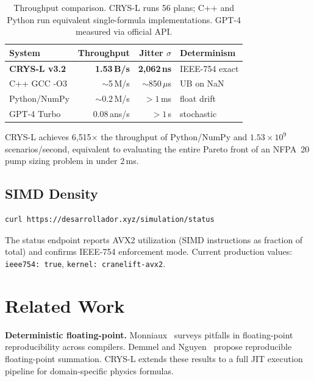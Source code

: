 \documentclass[10pt,twocolumn]{article}
\begin{document}
\begin{table}[h]
\centering
\small
\begin{tabular}{lrrl}
\toprule
System & Throughput & Jitter $\sigma$ & Determinism \\
\midrule
\textbf{CRYS-L v3.2} & \textbf{1.53\,B/s} & \textbf{2{,}062\,ns} & IEEE-754 exact \\
C++ GCC -O3 & $\sim$5\,M/s & $\sim$850\,$\mu$s & UB on NaN \\
Python/NumPy & $\sim$0.2\,M/s & $>1$\,ms & float drift \\
GPT-4 Turbo & 0.08\,ans/s & $>1$\,s & stochastic \\
\bottomrule
\end{tabular}
\caption{Throughput comparison. CRYS-L runs 56 plans; C++ and Python run equivalent
single-formula implementations. GPT-4 measured via official API.}
\label{tab:throughput}
\end{table}

CRYS-L achieves 6{,}515$\times$ the throughput of Python/NumPy and
$1.53\times10^9$ scenarios/second, equivalent to evaluating the entire
Pareto front of an NFPA~20 pump sizing problem in under 2\,ms.

\subsection{SIMD Density}

\begin{lstlisting}[language=bash]
curl https://desarrollador.xyz/simulation/status
\end{lstlisting}

The status endpoint reports AVX2 utilization (SIMD instructions as fraction of total)
and confirms IEEE-754 enforcement mode. Current production values:
\texttt{ieee754: true}, \texttt{kernel: cranelift-avx2}.

\section{Related Work}
\label{sec:related}

\textbf{Deterministic floating-point.} Monniaux~\cite{monniaux2008pitfalls} surveys
pitfalls in floating-point reproducibility across compilers. Demmel and
Nguyen~\cite{demmel2013fast} propose reproducible floating-point summation.
CRYS-L extends these results to a full JIT execution pipeline for
domain-specific physics formulas.
\end{document}
